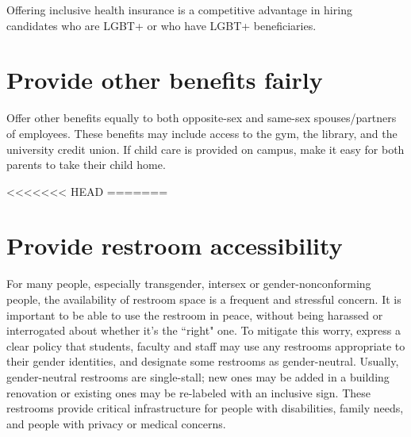 Offering inclusive health insurance is a competitive advantage in hiring candidates who are LGBT+ or who have LGBT+ beneficiaries.



\section {Provide other benefits fairly}
\label{other-benefits}
Offer other benefits equally to both opposite-sex and same-sex spouses/partners of employees.  These benefits may include access to the gym, the library, and the university credit union.  If child care is provided on campus, make it easy for both parents to take their child home.  

<<<<<<< HEAD
=======

\section {Provide restroom accessibility}
\label{restrooms}
For many people, especially transgender, intersex or gender-nonconforming people, the availability of restroom space is a frequent and stressful concern. It is important to be able to use the restroom in peace, without being harassed or interrogated about whether it's the ``right" one. To mitigate this worry, express a clear policy that students, faculty and staff may use any restrooms appropriate to their gender identities, and designate some restrooms as gender-neutral. Usually, gender-neutral restrooms are single-stall; new ones may be added in a building renovation or existing ones may be re-labeled with an inclusive sign. These restrooms provide critical infrastructure for people with disabilities, family needs, and people with privacy or medical concerns.

